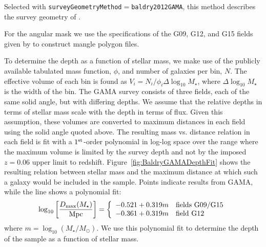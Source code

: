 Selected with {\tt surveyGeometryMethod}$=${\tt baldry2012GAMA}, this method describes the survey geometry of \cite{baldry_galaxy_2012}. 

For the angular mask we use the specifications of the G09, G12, and G15 fields given by \cite{driver_galaxy_2011} to construct {\sc mangle} polygon files.

To determine the depth as a function of stellar mass, we make use of the publicly available tabulated mass function, $\phi$, and number of galaxies per bin, $N$. The effective volume of each bin is found as $V_i = N_i/\phi_i\Delta\log_{10}M_\star$, where $\Delta\log_{10}M_\star$ is the width of the bin. The GAMA survey consists of three fields, each of the same solid angle, but with differing depths. We assume that the relative depths in terms of stellar mass scale with the depth in terms of flux. Given this assumption, these volumes are converted to maximum distances in each field using the solid angle quoted above. The resulting mass vs. distance relation in each field is fit with a $1^{\rm st}$-order polynomial in log-log space over the range where the maximum volume is limited by the survey depth and not by the imposed $z=0.06$ upper limit to redshift. Figure~\ref{fig:BaldryGAMADepthFit} shows the resulting relation between stellar mass and the maximum distance at which such a galaxy would be included in the sample. Points indicate results from GAMA, while the line shows a polynomial fit:
\begin{equation}
 \log_{10} \left[ {D_{\rm max}(M_\star) \over \hbox{Mpc}}\right] = \left\{ \begin{array}{ll} -0.521 + 0.319m & \hbox{fields G09/G15} \\ -0.361 + 0.319m & \hbox{field G12} \end{array} \right.
 \label{eq:BaldryDepthPolynomial}
\end{equation}
where $m= \log_{10}(M_\star/M_\odot)$. We use this polynomial fit to determine the depth of the sample as a function of stellar mass.

